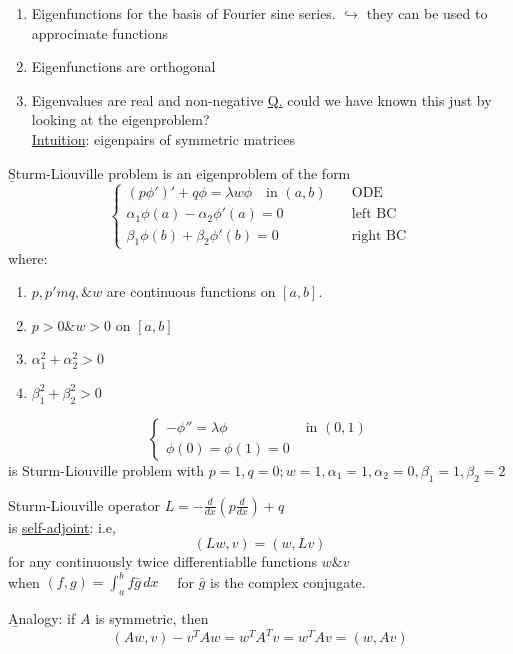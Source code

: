 \begin{enumerate}
    \item Eigenfunctions for the basis of Fourier sine series.
    $\hookrightarrow$ they can be used to approcimate functions
    \item Eigenfunctions are orthogonal
    \item Eigenvalues are real and non-negative
    \underline{Q.} could we have known this just by looking at the eigenproblem?
    \\\underline{Intuition}: eigenpairs of symmetric matrices
\end{enumerate}

\begin{definition}
    \b{Sturm-Liouville problem} is an eigenproblem of the form
    \[\begin{cases*}
        (p\phi')'+q\phi = \lambda w \phi \quad \text{in }(a,b) & \quad \text{ODE} \\
        \alpha_1 \phi(a) - \alpha_2 \phi'(a) = 0 & \quad \text{left BC} \\
        \beta_1 \phi(b) + \beta_2 \phi'(b) = 0 & \quad \text{right BC}
    \end{cases*}\]
    where:
    \begin{enumerate}[label = (\roman*)]
        \item $p, p'm q, \& w$ are continuous functions on $[a,b]$.
        \item $p>0 \& w > 0$ on $[a,b]$
        \item $\alpha_1^2 + \alpha_2^2 > 0$
        \item $\beta^2_1 + \beta_2^2 > 0$
    \end{enumerate}
\end{definition}

\begin{example}
    \[\begin{cases*}
        -\phi'' = \lambda\phi &\text{ in }(0,1)\\
        \phi(0) = \phi(1) = 0 &
    \end{cases*} \]
    is Sturm-Liouville problem with $p=1, q=0; w = 1, \alpha_1 = 1, \alpha_2 = 0, \beta_1 = 1, \beta_2 = 2$
\end{example}

\begin{theorem}
    Sturm-Liouville operator $L = -\frac{d}{dx}(p \frac{d}{dx}) + q$
    \\is \underline{self-adjoint}: i.e, 
    \[(Lw, v )= (w,Lv)\]
    for any continuously twice differentiablle functions $w \& v$ 
    \\when $(f,g)= \int_{a}^{b} f \bar{g}\,dx \quad$ for $\bar{g}$ is the complex conjugate.

    \b{Analogy}: if $A$ is symmetric, then
    \[(Aw, v) - v^TAw = w^T A^T v = w^T Av = (w, Av)\]
\end{theorem}


